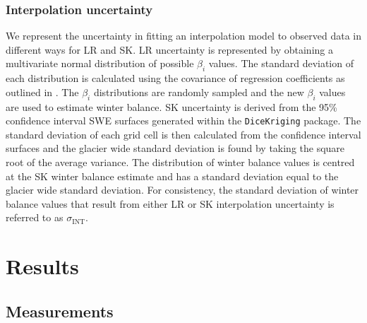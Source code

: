 \documentclass[review,oneside, letterpaper]{igs}
\begin{document}
\subsubsection{Interpolation uncertainty}
We represent the uncertainty in fitting an interpolation model to observed data in different ways for LR and SK. LR uncertainty is represented by obtaining a multivariate normal distribution of possible $\beta_i$ values. The standard deviation of each distribution is calculated using the covariance of regression coefficients as outlined in \cite{Bagos2015}. The $\beta_i$ distributions are randomly sampled and the new $\beta_i$ values are used to estimate winter balance. SK uncertainty is derived from the 95\% confidence interval SWE surfaces generated within the \texttt{DiceKriging} package. The standard deviation of each grid cell is then calculated from the confidence interval surfaces and the glacier wide standard deviation is found by taking the square root of the average variance. The distribution of winter balance values is centred at the SK winter balance estimate and has a standard deviation equal to the glacier wide standard deviation. For consistency, the standard deviation of winter balance values that result from either LR or SK interpolation uncertainty is referred to as $\sigma_{\mathrm{INT}}$.



\section{Results}

\subsection{Measurements}
\end{document}
